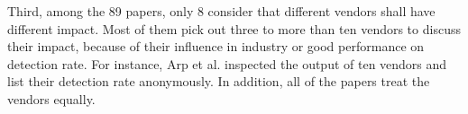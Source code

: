 Third, among the 89 papers, only 8 consider that different vendors shall have different impact. Most of them pick out three to more than ten vendors to discuss their impact, because of their influence in industry or good performance on detection rate. For instance, Arp et al. \cite{arp2014drebin} inspected the output of ten vendors and list their detection rate anonymously. In addition, all of the papers treat the vendors equally. %







